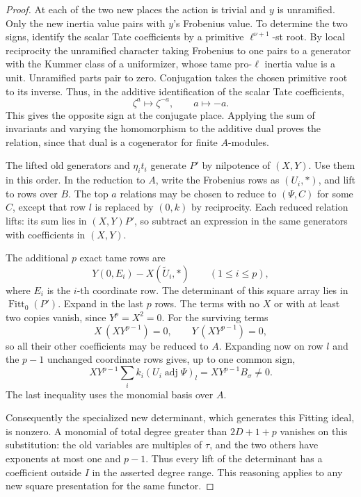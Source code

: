 \begin{proof}
At each of the two new places the action is
trivial and \(y\) is unramified. Only the new inertia value pairs with \(y\)'s Frobenius value. To determine the two signs, identify the scalar Tate coefficients by a primitive \(\ell^{\nu+1}\)-st root. By local reciprocity the unramified character taking Frobenius to one pairs to a generator with the Kummer class of a uniformizer, whose tame pro-\(\ell\) inertia value is a unit. Unramified parts pair to zero.
Conjugation takes the chosen primitive root to its inverse. Thus, in the additive identification of the scalar Tate coefficients,
\[
 \zeta^a\longmapsto\zeta^{-a},\qquad a\longmapsto-a.
\]
This gives the opposite sign at the conjugate place. Applying the
sum of invariants and varying the homomorphism to the additive
dual proves the relation, since that dual is a cogenerator
for finite \(A\)-modules. \cite{milne-duality,milne-cft}

The lifted old generators and \(\eta_i t_i\) generate \(P'\)
by nilpotence of \((X,Y)\). Use them in this order. In the
reduction to \(A\), write the Frobenius rows as \((U_i,*)\),
and lift to rows over \(B\). The top \(a\) relations may be
chosen to reduce to \((\Psi,C)\) for some \(C\), except that
row \(l\) is replaced by \((0,k)\) by reciprocity. Each
reduced relation lifts: its sum lies in \((X,Y)P'\), so
subtract an expression in the same generators with
coefficients in \((X,Y)\).

The additional \(p\) exact tame rows are
\[
 Y(0,E_i)-X(\widetilde U_i,*)\qquad(1\le i\le p),
\]
where \(E_i\) is the \(i\)-th coordinate row. The determinant of this square
array lies in \(\operatorname{Fitt}_0(P')\). Expand in the
last \(p\) rows. The terms with no \(X\) or with at least two copies vanish, since \(Y^p=X^2=0\). For the surviving terms
\[
 X\,(XY^{p-1})=0,\qquad Y\,(XY^{p-1})=0,
\]
so all their other coefficients
may be reduced to \(A\). Expanding now on row \(l\) and the
\(p-1\) unchanged coordinate rows gives, up to one common sign,
\[
       XY^{p-1}\sum_i k_i(U_i\operatorname{adj}\Psi)_l
                      =XY^{p-1}B_\sigma\ne0.
\]
The last inequality uses the monomial basis over \(A\).

Consequently the specialized new determinant, which generates
this Fitting ideal, is nonzero. A monomial of total degree
greater than \(2D+1+p\) vanishes on this substitution:
the old variables are multiples of \(\tau\), and the two others
have exponents at most one and \(p-1\). Thus every lift of
the determinant has a coefficient outside \(I\) in the
asserted degree range. This reasoning applies to any new
square presentation for the same functor.


\end{proof}

